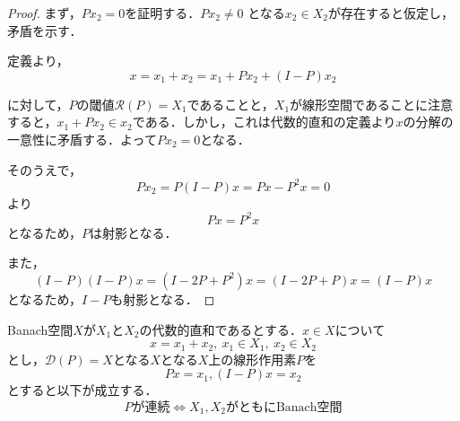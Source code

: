 \begin{proof}
  まず，$P{x_2}=0$を証明する．$P{x_2} \neq 0$ となる$x_2 \in X_2$が存在すると仮定し，矛盾を示す．

  定義より，
  \begin{equation*}
    x = x_1 + x_2 = x_1 + P{x_2} + (I-P)x_2
  \end{equation*}

  に対して，$P$の閾値$\mathcal{R}(P)=X_1$であることと，$X_1$が線形空間であることに注意すると，$x_1+Px_2 \in x_2 $である．しかし，これは代数的直和の定義より$x$の分解の一意性に矛盾する．よって$P{x_2}=0$となる．

  そのうえで，
  \begin{equation*}
    Px_2 = P(I-P)x = Px - P^2x = 0
  \end{equation*}
  より
  \begin{equation*}
    Px = P^2x
  \end{equation*}
  となるため，$P$は射影となる．

  また，
  \begin{equation*}
    (I-P)(I-P)x = (I-2P+P^2)x = (I - 2P + P)x = (I-P)x
  \end{equation*}
  となるため，$I-P$も射影となる．
\end{proof}

\begin{thm}
  Banach空間$X$が$X_1$と$X_2$の代数的直和であるとする．$x \in X$について
  \begin{equation*}
    x = x_1 + x_2,\ x_1 \in X_1,\ x_2\in X_2
  \end{equation*}
  とし，$\mathcal{D}(P)=X$となる$X$となる$X$上の線形作用素$P$を
  \begin{equation*}
    Px = x_1, (I-P)x = x_2
  \end{equation*}
  とすると以下が成立する．
  \begin{equation*}
    Pが連続 \Leftrightarrow X_1, X_2 がともに\text{Banach}空間
  \end{equation*}
\end{thm}

